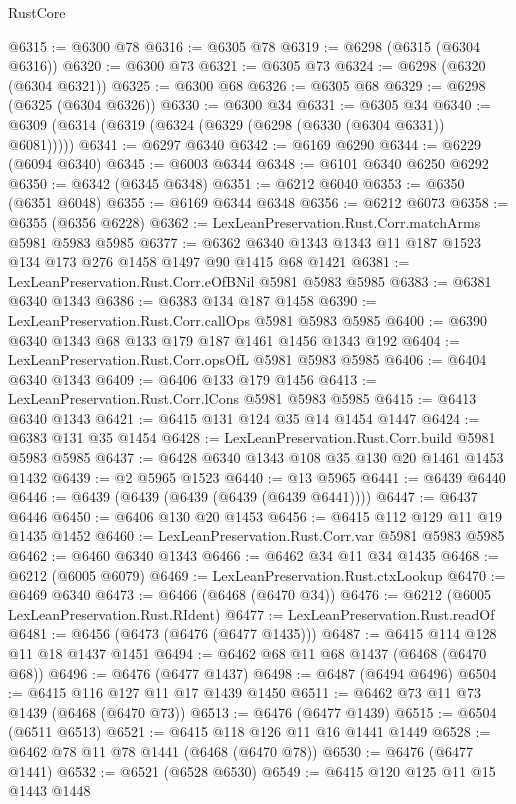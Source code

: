 \begin{lexlean}{RustCore}
\begin{coremodule}
@6315 := @6300 @78
@6316 := @6305 @78
@6319 := @6298 (@6315 (@6304 @6316))
@6320 := @6300 @73
@6321 := @6305 @73
@6324 := @6298 (@6320 (@6304 @6321))
@6325 := @6300 @68
@6326 := @6305 @68
@6329 := @6298 (@6325 (@6304 @6326))
@6330 := @6300 @34
@6331 := @6305 @34
@6340 := @6309 (@6314 (@6319 (@6324 (@6329 (@6298 (@6330 (@6304 @6331)) @6081)))))
@6341 := @6297 @6340
@6342 := @6169 @6290
@6344 := @6229 (@6094 @6340)
@6345 := @6003 @6344
@6348 := @6101 @6340 @6250 @6292
@6350 := @6342 (@6345 @6348)
@6351 := @6212 @6040
@6353 := @6350 (@6351 @6048)
@6355 := @6169 @6344 @6348
@6356 := @6212 @6073
@6358 := @6355 (@6356 @6228)
@6362 := LexLeanPreservation.Rust.Corr.matchArms @5981 @5983 @5985
@6377 := @6362 @6340 @1343 @1343 @11 @187 @1523 @134 @173 @276 @1458 @1497 @90 @1415 @68 @1421
@6381 := LexLeanPreservation.Rust.Corr.eOfBNil @5981 @5983 @5985
@6383 := @6381 @6340 @1343
@6386 := @6383 @134 @187 @1458
@6390 := LexLeanPreservation.Rust.Corr.callOps @5981 @5983 @5985
@6400 := @6390 @6340 @1343 @68 @133 @179 @187 @1461 @1456 @1343 @192
@6404 := LexLeanPreservation.Rust.Corr.opsOfL @5981 @5983 @5985
@6406 := @6404 @6340 @1343
@6409 := @6406 @133 @179 @1456
@6413 := LexLeanPreservation.Rust.Corr.lCons @5981 @5983 @5985
@6415 := @6413 @6340 @1343
@6421 := @6415 @131 @124 @35 @14 @1454 @1447
@6424 := @6383 @131 @35 @1454
@6428 := LexLeanPreservation.Rust.Corr.build @5981 @5983 @5985
@6437 := @6428 @6340 @1343 @108 @35 @130 @20 @1461 @1453 @1432
@6439 := @2 @5965 @1523
@6440 := @13 @5965
@6441 := @6439 @6440
@6446 := @6439 (@6439 (@6439 (@6439 (@6439 @6441))))
@6447 := @6437 @6446
@6450 := @6406 @130 @20 @1453
@6456 := @6415 @112 @129 @11 @19 @1435 @1452
@6460 := LexLeanPreservation.Rust.Corr.var @5981 @5983 @5985
@6462 := @6460 @6340 @1343
@6466 := @6462 @34 @11 @34 @1435
@6468 := @6212 (@6005 @6079)
@6469 := LexLeanPreservation.Rust.ctxLookup
@6470 := @6469 @6340
@6473 := @6466 (@6468 (@6470 @34))
@6476 := @6212 (@6005 LexLeanPreservation.Rust.RIdent)
@6477 := LexLeanPreservation.Rust.readOf
@6481 := @6456 (@6473 (@6476 (@6477 @1435)))
@6487 := @6415 @114 @128 @11 @18 @1437 @1451
@6494 := @6462 @68 @11 @68 @1437 (@6468 (@6470 @68))
@6496 := @6476 (@6477 @1437)
@6498 := @6487 (@6494 @6496)
@6504 := @6415 @116 @127 @11 @17 @1439 @1450
@6511 := @6462 @73 @11 @73 @1439 (@6468 (@6470 @73))
@6513 := @6476 (@6477 @1439)
@6515 := @6504 (@6511 @6513)
@6521 := @6415 @118 @126 @11 @16 @1441 @1449
@6528 := @6462 @78 @11 @78 @1441 (@6468 (@6470 @78))
@6530 := @6476 (@6477 @1441)
@6532 := @6521 (@6528 @6530)
@6549 := @6415
    @120
    @125
    @11
    @15
    @1443
    @1448

\end{coremodule}
\end{lexlean}

